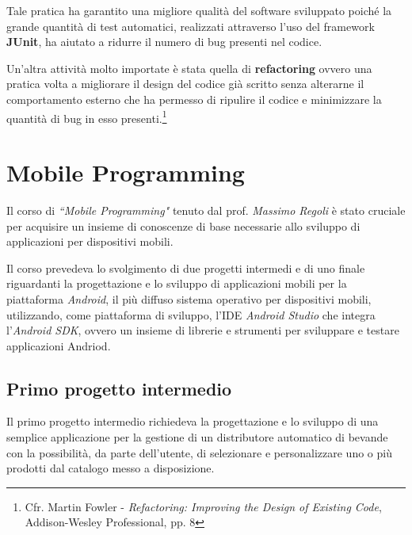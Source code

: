 \documentclass[10pt,a4paper, titlepage]{article}
\begin{document}
Tale pratica ha garantito una migliore qualità del software sviluppato poiché la grande quantità di test automatici, realizzati attraverso l'uso del framework \textbf{JUnit}, ha aiutato a ridurre il numero di bug presenti nel codice.

Un'altra attività molto importate è stata quella di \textbf{refactoring} ovvero una pratica volta a migliorare il design del codice già scritto senza alterarne il comportamento esterno che ha permesso di ripulire il codice e minimizzare la quantità di bug in esso presenti.\footnote{Cfr. Martin Fowler - \textit{Refactoring: Improving the Design of Existing Code}, Addison-Wesley Professional, pp. 8}


\newpage
\section{Mobile Programming}

Il corso di \textit{``Mobile Programming"} tenuto dal prof. \textit{Massimo Regoli} è stato cruciale per acquisire un insieme di conoscenze di base necessarie allo sviluppo di applicazioni per dispositivi mobili. 

Il corso prevedeva lo svolgimento di due progetti intermedi e di uno finale riguardanti la progettazione e lo sviluppo di applicazioni mobili per la piattaforma \textit{Android}, il più diffuso sistema operativo per dispositivi mobili, utilizzando, come piattaforma di sviluppo, l'IDE \textit{Android Studio} che integra l'\textit{Android SDK}, ovvero un insieme di librerie e strumenti per sviluppare e testare applicazioni Andriod.

\subsection{Primo progetto intermedio}
Il primo progetto intermedio richiedeva la progettazione e lo sviluppo di una semplice applicazione per la gestione di un distributore automatico di bevande con la possibilità, da parte dell'utente, di selezionare e personalizzare uno o più prodotti dal catalogo messo a disposizione. 
\end{document}

